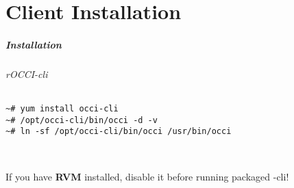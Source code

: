 \part{Client Installation}

\begin{frame}[fragile]
  \frametitle{Installation}
  \framesubtitle{rOCCI-cli}

  \begin{Sbox}
  \Fontsmaller
  \begin{minipage}{\linewidth-2\fboxsep-2\fboxrule-4pt}
  \color{white}
  \begin{verbatim}
~# yum install occi-cli
~# /opt/occi-cli/bin/occi -d -v
~# ln -sf /opt/occi-cli/bin/occi /usr/bin/occi
  \end{verbatim}
  \end{minipage}
  \end{Sbox}

  \hfill\\
  \begin{center}
    If you have \textbf{RVM} installed, disable it before running packaged \rocci-cli!
  \end{center}
\end{frame}
